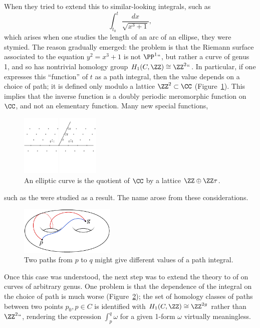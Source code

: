 When they tried to extend this to similar-looking integrals, such as
$$
\int_{t_0}^t \frac{dx}{\sqrt{x^3+1}},
$$
which arises when one studies the length of an arc of an ellipse, they
%
were stymied. The reason gradually emerged: the problem is that the
Riemann surface associated to the equation $y^2 = x^3+1$ is not
$\PP^1` `$, but rather a curve of genus 1, and so has nontrivial
homology group $H_1(C, \ZZ) \cong \ZZ^2` `$. In particular, if one
expresses this ``function'' of $t$  as a path integral, then the value
\vadjust{\goodbreak}%
depends on a choice of path; it is defined only modulo a lattice
$\ZZ^2 \subset \CC$ (Figure~\ref{a lattice}). This implies
that the inverse function is a doubly periodic 
%
meromorphic function
on
$\CC$, and not an elementary function. Many new special functions,
%
\begin{figure}
\centerline{\includegraphics[height=1.15in,trim=0 40 0 12,clip]{"main/Fig04-2"}}
\vskip-6pt
\caption{An elliptic curve is the quotient of $\CC$ by a lattice $\ZZ\oplus \ZZ\tau$.}
\label{a lattice}
%
\end{figure}
%
such as the 
%
%
%
were studied as a result. The name 
%
arose from these considerations. 

\begin{figure}[b]
\vskip3pt
\includegraphics[height=0.9in]{"main/Fig04-1"}
\vskip-3pt
\caption{Two paths from $p$ to $q$ might give different values of a path integral.}
\label{dependence on path}
\end{figure}

Once this case was understood, the next step was to extend the theory
to
%
of 
%
on curves of arbitrary
genus. One problem is that the dependence of the integral on the
choice of path is much worse 
(Figure~\ref{dependence on path});
the set of homology classes of paths
between two points $p_0, p \in C$ is identified with $H_1(C,\ZZ) \cong
\ZZ^{2g}$ rather than $\ZZ^2` `$, rendering the expression $\int_p^q
\omega$ for a given 1-form $\omega$ virtually meaningless. 
{\meshing\par}

